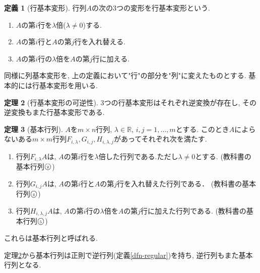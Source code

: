 \documentclass[dvipdfmx,a4paper,11pt]{article}
\newcommand{\R}{\mathbb{R}}
\newcommand{\maru}[1]{\raise0.2ex\hbox{\textcircled{\tiny{#1}}}}
\theoremstyle{definition}
\newtheorem{thm}{定理}
\newtheorem{dfn}[thm]{定義}
\begin{document}
  \begin{tcolorbox}[
    colback = white,
    colframe = green!35!black,
    fonttitle = \bfseries,
    breakable = true]
    \begin{dfn}[行基本変形]
    \label{dfn-basic-trans}
 行列$A$の次の3つの変形を行基本変形という.
 \begin{enumerate}
   \setlength{\parskip}{0cm} 
  \setlength{\itemsep}{0cm}
  \item $A$の第$i$行を$\lambda$倍($\lambda\neq 0$)する.
 \item $A$の第$i$行と$A$の第$j$行を入れ替える.
 \item $A$の第$i$行の$\lambda$倍を$A$の第$j$行に加える. 
 \end{enumerate}
  \end{dfn}
  \end{tcolorbox}
  同様に列基本変形を, 上の定義において"行"の部分を"列"に変えたものとする. 
  基本的には行基本変形を用いる. 
  
    
  \begin{tcolorbox}[
    colback = white,
    colframe = green!35!black,
    fonttitle = \bfseries,
    breakable = true]
    \begin{thm}[行基本変形の可逆性]
    \label{thm-inv-basic}
3つの行基本変形はそれぞれ逆変換が存在し, その逆変換もまた行基本変形である. 
  \end{thm}
  \end{tcolorbox}
  
  
\begin{tcolorbox}[
    colback = white,
    colframe = green!35!black,
    fonttitle = \bfseries,
    breakable = true]
    \begin{thm}[基本行列]
    \label{thm-basic}
$A$を$m \times n$行列, $\lambda \in \R$, $i,j = 1, \ldots, m$とする.
    このとき$A$によらないある$m \times m$行列$F_{i,\lambda}, G_{i,j}, H_{i, \lambda, j}$があってそれぞれ次を満たす.  
 \begin{enumerate}
   \setlength{\parskip}{0cm} 
  \setlength{\itemsep}{0cm}
  \item 行列$F_{i,\lambda}A$は, $A$の第$i$行を$\lambda$倍した行列である.ただし$\lambda \neq 0$とする. (教科書の基本行列$\maru{2}$)
 \item 行列$G_{i,j}A$は, $A$の第$i$行と$A$の第$j$行を入れ替えた行列である． (教科書の基本行列$\maru{4}$)
 \item 行列$H_{i,\lambda, j}A$は, $A$の第$i$行の$\lambda$倍を$A$の第$j$行に加えた行列である. (教科書の基本行列$\maru{5}$)
 \end{enumerate}
 これらは基本行列と呼ばれる. 
 
  \end{thm}
  \end{tcolorbox}
  定理\ref{thm-inv-basic}から基本行列は正則で逆行列(定義\ref{dfn-regular})を持ち, 逆行列もまた基本行列となる.
  
\end{document}
